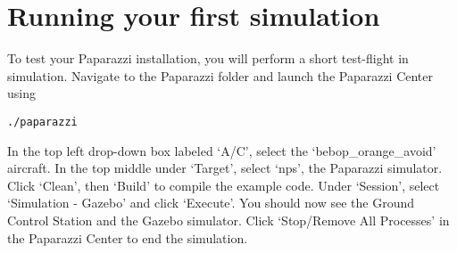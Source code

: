 \documentclass{article}
\begin{document}
\section{Running your first simulation}
To test your Paparazzi installation, you will perform a short test-flight in simulation.
Navigate to the Paparazzi folder and launch the Paparazzi Center using
\begin{lstlisting}[style=Bash]
./paparazzi
\end{lstlisting}
In the top left drop-down box labeled `A/C', select the `bebop\_orange\_avoid' aircraft.
In the top middle under `Target', select `nps', the Paparazzi simulator.
Click `Clean', then `Build' to compile the example code.
Under `Session', select `Simulation - Gazebo' and click `Execute'. You should now see the Ground Control Station and the Gazebo simulator.
Click `Stop/Remove All Processes' in the Paparazzi Center to end the simulation.
\end{document}
